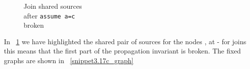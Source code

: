 \begin{figure}[H]

\caption{
Join shared sources\\
after \lstinline{assume a=c} \\
broken
}
\label{snippet3.17b_graph}
\end{figure}
In ~\ref{snippet3.17b_graph} we have highlighted the shared pair of sources for the nodes ,  at  - 
for joins this means that the first part of the propagation invariant is broken.
The fixed graphs are shown in ~\ref{snippet3.17c_graph}
